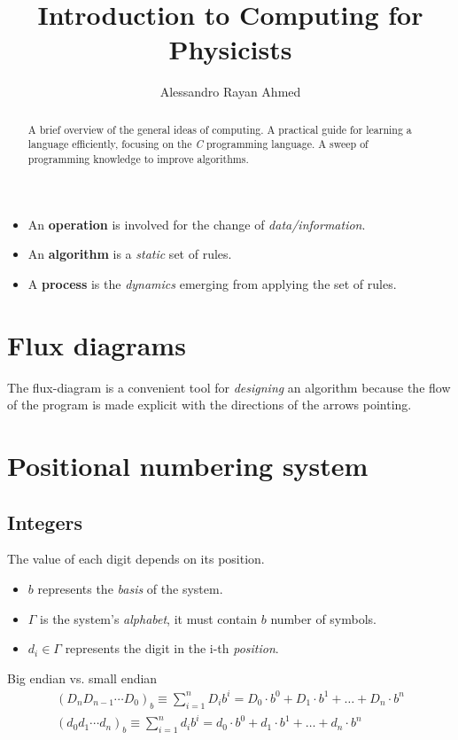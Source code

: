 \documentclass{article}
\title{Introduction to Computing for Physicists}
\author{Alessandro Rayan Ahmed}
\begin{document}
\maketitle
\begin{abstract}
  A brief overview of the general ideas of computing. A practical guide for
  learning a language efficiently, focusing on the \textit{C} programming
  language. A sweep of programming knowledge to improve algorithms.
\end{abstract}


\begin{itemize}
\item An \textbf{operation} is involved for the change of \textit{data/information}.
\item An \textbf{algorithm} is a \textit{static} set of rules.
\item A \textbf{process} is the \textit{dynamics} emerging from applying the set of rules.
\end{itemize}

\section{Flux diagrams}
The flux-diagram is a convenient tool for \textit{designing} an
algorithm because the flow of the program is made explicit with
the directions of the arrows pointing.

\section{Positional numbering system}
\subsection{Integers}
The value of each digit depends on its position.
\begin{itemize}
\item $b$ represents the \textit{basis} of the system.
\item $\Gamma$ is the system's \textit{alphabet}, it must contain $b$ number of symbols.
\item $d_i \in \Gamma$ represents the digit in the i-th \textit{position}.
\end{itemize}

Big endian vs. small endian
\begin{equation}
  \label{eq:positional-representation}
  \begin{gathered}
    (D_nD_{n-1}\cdots D_0)_b \equiv \sum_{i=1}^n D_ib^i = D_0 \cdot b^0 + D_1 \cdot b^1 + \dots + D_n \cdot b^n \\
    (d_0d_1\cdots d_n)_b \equiv \sum_{i=1}^n d_ib^i = d_0 \cdot b^0 + d_1 \cdot b^1 + \dots + d_n \cdot b^n
  \end{gathered}
\end{equation}
\end{document}
